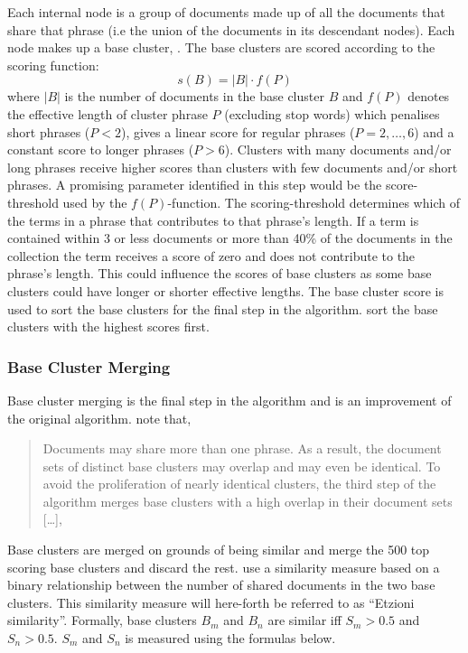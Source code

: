 Each internal node is a group of documents made up of all the documents that share that phrase (i.e the union of the documents in its descendant nodes). Each node makes up a base cluster, \parencite{Oren1998}. The base clusters are scored according to the scoring function: 
\begin{displaymath}s(B) = 
\vert B \vert \cdot f(P)
\end{displaymath} 
where \(\vert B \vert\) 
is the number of documents in the base cluster \(B\) and  \(f(P)\) denotes the effective length of cluster phrase \(P\) (excluding stop words) which penalises short phrases (\( P < 2\)), gives a linear score for regular phrases (\(P = {2,\dots,6}\)) and a constant score to longer phrases (\( P > 6\)). Clusters with many documents and/or long phrases receive higher scores than clusters with few documents and/or short phrases. A promising parameter identified in this step would be the score-threshold used by the \(f(P)\)-function. The scoring-threshold determines which of the terms in a phrase that contributes to that phrase's length. If a term is contained within 3 or less documents or more than 40\% of the documents in the collection the term receives a score of zero and does not contribute to the phrase's length. This could influence the scores of base clusters as some base clusters could have longer or shorter effective lengths. The base cluster score is used to sort the base clusters for the final step in the \STC algorithm. \cite{Oren1998} sort the base clusters with the highest scores first.

\subsubsection{Base Cluster Merging}
Base cluster merging is the final step in the \STC algorithm and is an improvement of the original algorithm. \citeauthor{Oren1998} note that,
\begin{quote}
Documents may share more than one phrase. As a result, the document sets of distinct base clusters may overlap and may even be identical. To avoid the proliferation of nearly identical clusters, the third step of the algorithm merges base clusters with a high overlap in their document sets [\dots], \parencite[][3]{Oren1998}
\end{quote}

Base clusters are merged on grounds of being similar and \cite{Oren1998} merge the 500 top scoring base clusters and discard the rest. \citeauthor{Oren1998} use a similarity measure based on a binary relationship between the number of shared documents in the two base clusters. This similarity measure will here-forth be referred to as ``Etzioni similarity''. Formally, base clusters \(B_m\) and \(B_n\) are similar iff \(S_{m} > 0.5\) and \(S_{n} > 0.5 \). \(S_{m}\) and \(S_{n}\) is measured using the formulas below.

